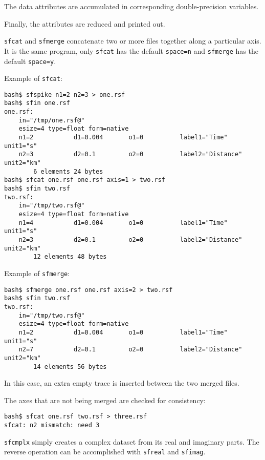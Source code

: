 The data attributes are accumulated in corresponding double-precision
variables. 

Finally, the attributes are reduced and printed out.

\noindent\doublebox{\parbox{\textwidth}{

}}

\texttt{sfcat} and \texttt{sfmerge} concatenate two or more files
together along a particular axis. It is the same program, only
\texttt{sfcat} has the default \texttt{space=n} and \texttt{sfmerge}
has the default \texttt{space=y}.

Example of \texttt{sfcat}:
\begin{verbatim}
bash$ sfspike n1=2 n2=3 > one.rsf
bash$ sfin one.rsf
one.rsf:
    in="/tmp/one.rsf@"
    esize=4 type=float form=native
    n1=2           d1=0.004       o1=0          label1="Time" unit1="s"
    n2=3           d2=0.1         o2=0          label2="Distance" unit2="km"
        6 elements 24 bytes
bash$ sfcat one.rsf one.rsf axis=1 > two.rsf
bash$ sfin two.rsf
two.rsf:
    in="/tmp/two.rsf@"
    esize=4 type=float form=native
    n1=4           d1=0.004       o1=0          label1="Time" unit1="s"
    n2=3           d2=0.1         o2=0          label2="Distance" unit2="km"
        12 elements 48 bytes
\end{verbatim}

Example of \texttt{sfmerge}:
\begin{verbatim}
bash$ sfmerge one.rsf one.rsf axis=2 > two.rsf
bash$ sfin two.rsf
two.rsf:
    in="/tmp/two.rsf@"
    esize=4 type=float form=native
    n1=2           d1=0.004       o1=0          label1="Time" unit1="s"
    n2=7           d2=0.1         o2=0          label2="Distance" unit2="km"
        14 elements 56 bytes
\end{verbatim}
In this case, an extra empty trace is inserted between the two merged files.

The axes that are not being merged are checked for consistency:
\begin{verbatim}
bash$ sfcat one.rsf two.rsf > three.rsf
sfcat: n2 mismatch: need 3
\end{verbatim}

\noindent\doublebox{\parbox{\textwidth}{

}}

\texttt{sfcmplx} simply creates a complex dataset from its real and
imaginary parts. The reverse operation can be accomplished with
\texttt{sfreal} and \texttt{sfimag}.

